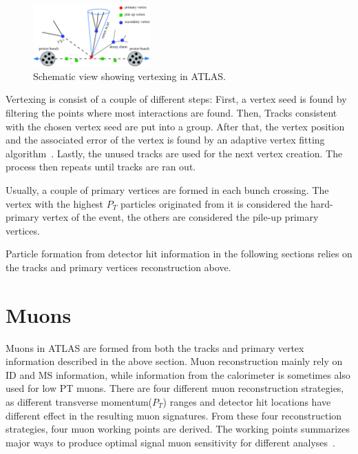 \begin{figure}[!htb]
    \begin{center}
        \includegraphics[width=0.4\textwidth]{figures/common_ana/Vertex}
        \caption{        
            Schematic view showing vertexing in ATLAS\cite{4774734}.
        }
    \end{center}
\end{figure}

Vertexing is consist of a couple of different steps: First, a vertex seed is found by filtering the points where most interactions are found. Then, Tracks consistent with the chosen vertex seed are put into a group. After that, the vertex position and the associated error of the vertex is found by an adaptive vertex fitting algorithm~\cite{track}. Lastly, the unused tracks are used for the next vertex creation. The process then repeats until tracks are ran out. 

Usually, a couple of primary vertices are formed in each bunch crossing. The vertex with the highest $P_{T}$ particles originated from it is considered the hard-primary vertex of the event, the others are considered the pile-up primary vertices. 

Particle formation from detector hit information in the following sections relies on the tracks and primary vertices reconstruction above.

\section{Muons}
\label{sec:Muon}
Muons in ATLAS are formed from both the tracks and primary vertex information described in the above section. Muon reconstruction mainly rely on ID and MS information, while information from the calorimeter is sometimes also used for low PT muons. There are four different muon reconstruction strategies, as different transverse momentum($P_{T}$) ranges and detector hit locations have different effect in the resulting muon signatures. From these four reconstruction strategies, four muon working
points are derived. The working points summarizes major ways to produce optimal signal muon sensitivity for different analyses~\cite{Aad:2746302}.

